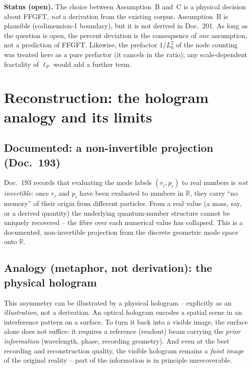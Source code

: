 \medskip

\noindent
\textbf{Status (open).} The choice between Assumption~B and~C is a physical
decision about FFGFT, \emph{not} a derivation from the existing corpus.
Assumption~B is plausible (codimension-1 boundary), but it is not derived in
Doc.~201. As long as the question is open, the percent deviation is the
consequence of \emph{one} assumption, not a prediction of FFGFT. Likewise,
the prefactor $1/L_0^2$ of the node counting was treated here as a pure prefactor (it cancels in
the ratio); any scale-dependent fractality of $\ell_P$ would add a further
term.

\section{Reconstruction: the hologram analogy and its limits}

\subsection*{Documented: a non-invertible projection (Doc.~193)}

Doc.~193 records that evaluating the mode labels $(r_i, p_i)$ to real numbers
is \emph{not invertible}: once $r_i$ and $p_i$ have been evaluated to numbers
in $\mathbb{R}$, they carry \enquote{no memory} of their origin from
different particles. From a real value (a mass, say, or a derived quantity)
the underlying quantum-number structure cannot be uniquely recovered -- the
fibre over each numerical value has collapsed. This is a documented,
non-invertible projection from the discrete geometric mode space onto
$\mathbb{R}$.

\subsection*{Analogy (metaphor, not derivation): the physical hologram}

This asymmetry can be illustrated by a physical hologram -- explicitly as an
\emph{illustration}, not a derivation. An optical hologram encodes a spatial
scene in an interference pattern on a surface. To turn it back into a visible
image, the surface alone does not suffice: it requires a reference (readout)
beam carrying the \emph{prior information} (wavelength, phase, recording
geometry). And even at the best recording and reconstruction quality, the
visible hologram remains a \emph{faint image} of the original reality -- part
of the information is in principle unrecoverable.

